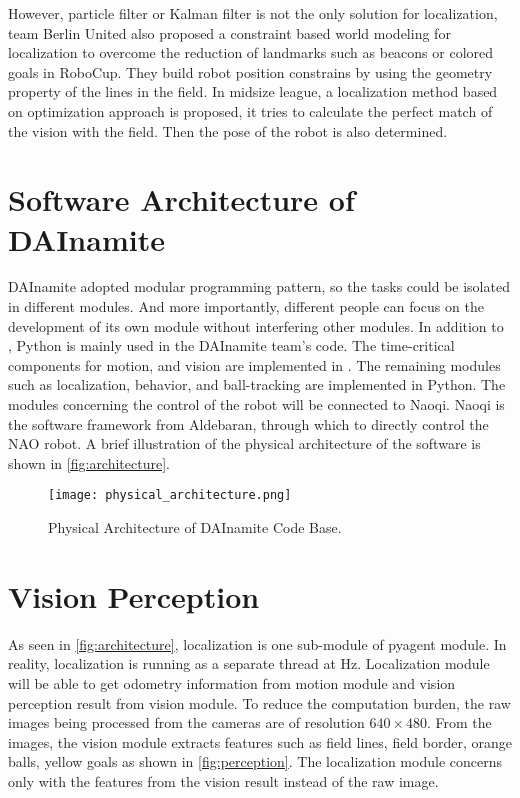 However, particle filter or Kalman filter is not the only solution for localization, team Berlin United also proposed a constraint based world modeling for localization \cite{Gohring2009} to overcome the reduction of landmarks such as beacons or colored goals in RoboCup. They build robot position constrains by using the geometry property of the lines in the field. In midsize league, a localization method based on optimization approach \cite{Lauer2006} is proposed, it tries to calculate the perfect match of the vision with the field. Then the pose of the robot is also determined.



\section{Software Architecture of DAInamite}\label{sec:arch}
DAInamite adopted modular programming pattern, so the tasks could be isolated in different modules. And more importantly, different people can focus on the development of its own module without interfering other modules. In addition to \cpp{}, Python is mainly used in the DAInamite team's code.
The time-critical components for motion, and vision are implemented in \cpp{}. The remaining modules such as localization, behavior, and ball-tracking are implemented in Python. The modules concerning the control of the robot will be connected to Naoqi. Naoqi is the software framework from Aldebaran, through which to directly control the NAO robot. A brief illustration of the physical architecture of the software is shown in \autoref{fig:architecture}. 

\begin{figure}[h!]
  \centering
  \texttt{[image: physical\_architecture.png]}
  \caption{Physical Architecture of DAInamite Code Base.}
  \label{fig:architecture}
\end{figure}

\section{Vision Perception}\label{sec:vision}
As seen in \autoref{fig:architecture}, localization is one sub-module of pyagent module. In reality, localization is running as a separate thread at \unit[30]{Hz}. Localization module will be able to get odometry information from motion module and vision perception result from vision module. To reduce the computation burden, the raw images being processed from the cameras are of resolution $640 \times 480$. From the images, the vision module extracts features such as field lines, field border, orange balls, yellow goals as shown in \autoref{fig:perception}. The localization module concerns only with the features from the vision result instead of the raw image.

